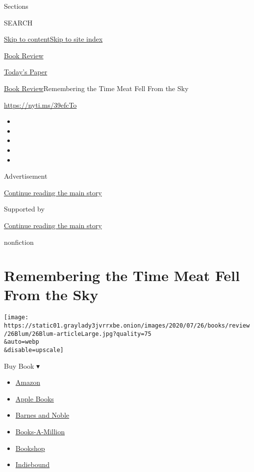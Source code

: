 Sections

SEARCH

\protect\hyperlink{site-content}{Skip to
content}\protect\hyperlink{site-index}{Skip to site index}

\href{https://www.nytimes3xbfgragh.onion/section/books/review}{Book
Review}

\href{https://myaccount.nytimes3xbfgragh.onion/auth/login?response_type=cookie\&client_id=vi}{}

\href{https://www.nytimes3xbfgragh.onion/section/todayspaper}{Today's
Paper}

\href{/section/books/review}{Book Review}\textbar{}Remembering the Time
Meat Fell From the Sky

\url{https://nyti.ms/39efcTo}

\begin{itemize}
\item
\item
\item
\item
\item
\end{itemize}

Advertisement

\protect\hyperlink{after-top}{Continue reading the main story}

Supported by

\protect\hyperlink{after-sponsor}{Continue reading the main story}

nonfiction

\hypertarget{remembering-the-time-meat-fell-from-the-sky}{%
\section{Remembering the Time Meat Fell From the
Sky}\label{remembering-the-time-meat-fell-from-the-sky}}

\texttt{[image: https://static01.graylady3jvrrxbe.onion/images/2020/07/26/books/review/26Blum/26Blum-articleLarge.jpg?quality=75\\\&auto=webp\\\&disable=upscale]}

Buy Book ▾

\begin{itemize}
\tightlist
\item
  \href{https://www.amazon.com/gp/search?index=books\&tag=NYTBSREV-20\&field-keywords=The+Unidentified+Colin+Dickey}{Amazon}
\item
  \href{https://du-gae-books-dot-nyt-du-prd.appspot.com/buy?title=The+Unidentified\&author=Colin+Dickey}{Apple
  Books}
\item
  \href{https://www.anrdoezrs.net/click-7990613-11819508?url=https\%3A\%2F\%2Fwww.barnesandnoble.com\%2Fw\%2F\%3Fean\%3D9780525557562}{Barnes
  and Noble}
\item
  \href{https://www.anrdoezrs.net/click-7990613-35140?url=https\%3A\%2F\%2Fwww.booksamillion.com\%2Fp\%2FThe\%2BUnidentified\%2FColin\%2BDickey\%2F9780525557562}{Books-A-Million}
\item
  \href{https://bookshop.org/a/3546/9780525557562}{Bookshop}
\item
  \href{https://www.indiebound.org/book/9780525557562?aff=NYT}{Indiebound}
\end{itemize}

